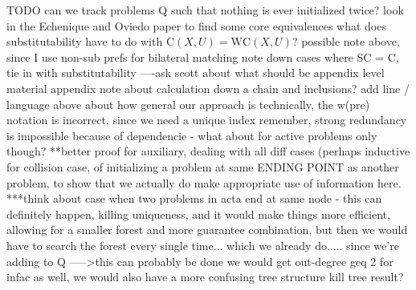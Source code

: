 \documentclass[11pt,reqno]{amsart}
\theoremstyle{definition}
\numberwithin{equation}{section}
\newcommand{\strcore}{\mathrm{C}(X,U)}
\newcommand{\core}{\mathrm{WC}(X,U)}
\begin{document}
TODO
can we track problems Q such that nothing is ever initialized twice? 
look in the Echenique and Oviedo paper to find some core equivalences
what does substitutability have to do with $\strcore = \core$?
    possible note above, since I use non-sub prefs for bilateral matching
note down cases where SC = C, tie in with substitutability
----ask scott about what should be appendix level material 
appendix note about calculation down a chain and inclusions?
add line / language above about how general our approach is
technically, the w(pre) notation is incorrect, since we need a unique index
remember, strong redundancy is impossible because of dependencie - what about for active problems only though?
**better proof for auxiliary, dealing with all diff cases (perhaps inductive for collision case, of initializing a problem at same ENDING POINT as another problem, to show that we actually do make appropriate use of information here.
***think about case when two problems in acta end at same node - this can definitely happen, killing uniqueness, and it would make things more efficient, allowing for a smaller forest and more guarantee combination, but then we would have to search the forest every single time... which we already do..... since we're adding to Q
    ----->this can probably be done
    we would get out-degree geq 2 for infac as well, we would also have a more confusing tree structure
    kill tree result?



\end{document}
